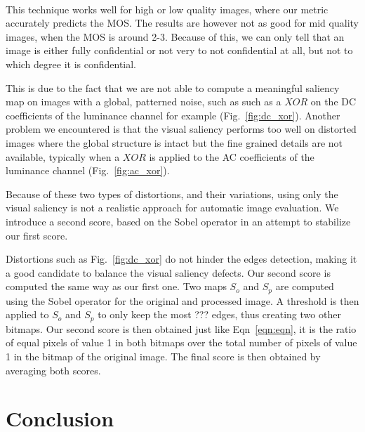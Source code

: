 \documentclass{article}
\begin{document}

\paragraph*{}
This technique works well for high or low quality images, where our metric accurately predicts the MOS. The results are however not as good for mid quality images, when the MOS is around 2-3. Because of this, we can only tell that an image is either fully confidential or not very to not confidential at all, but not to which degree it is confidential.

This is due to the fact that we are not able to compute a meaningful saliency map on images with a global, patterned noise, such as such as a $XOR$ on the DC coefficients of the luminance channel for example (Fig.~\ref{fig:dc_xor}). Another problem we encountered is that the visual saliency performs too well on distorted images where the global structure is intact but the fine grained details are not available, typically when a $XOR$ is applied to the AC coefficients of the luminance channel (Fig.~\ref{fig:ac_xor}).

Because of these two types of distortions, and their variations, using only the visual saliency is not a realistic approach for automatic image evaluation. We introduce a second score, based on the Sobel operator in an attempt to stabilize our first score.

Distortions such as Fig.~\ref{fig:dc_xor} do not hinder the edges detection, making it a good candidate to balance the visual saliency defects. Our second score is computed the same way as our first one. Two maps $S_o$ and $S_p$ are computed using the Sobel operator for the original and processed image. A threshold is then applied to $S_o$ and $S_p$ to only keep the most ??? edges, thus creating two other bitmaps. Our second score is then obtained just like Eqn~\ref{eqn:eqn}, it is the ratio of equal pixels of value 1 in both bitmaps over the total number of pixels of value 1 in the bitmap of the original image. The final score is then obtained by averaging both scores.


\section{Conclusion}
\label{sec:conclusion}

\newpage


\end{document}
